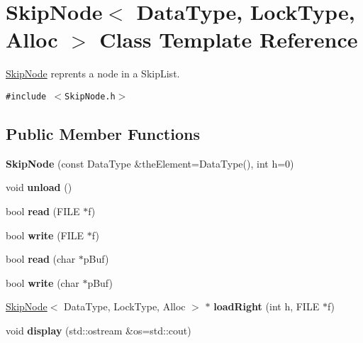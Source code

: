 \hypertarget{classSkipNode}{
\section{SkipNode$<$ DataType, LockType, Alloc $>$ Class Template Reference}
\label{classSkipNode}
}
\hyperlink{classSkipNode}{SkipNode} reprents a node in a SkipList.  


{\tt \#include $<$SkipNode.h$>$}

\subsection*{Public Member Functions}
\begin{CompactItemize}
\item 
\hypertarget{classSkipNode_6c98e4822d4b00cddbb01b01d07b5408}{
\textbf{SkipNode} (const DataType \&theElement=DataType(), int h=0)}
\label{classSkipNode_6c98e4822d4b00cddbb01b01d07b5408}

\item 
\hypertarget{classSkipNode_98dbc2bd65c86d186c8a7df78812d7b5}{
void \textbf{unload} ()}
\label{classSkipNode_98dbc2bd65c86d186c8a7df78812d7b5}

\item 
\hypertarget{classSkipNode_3ba2f338d42d5c75101e5488c72e8ee8}{
bool \textbf{read} (FILE $\ast$f)}
\label{classSkipNode_3ba2f338d42d5c75101e5488c72e8ee8}

\item 
\hypertarget{classSkipNode_beb14d9210efcfb491ef2514f7fccb56}{
bool \textbf{write} (FILE $\ast$f)}
\label{classSkipNode_beb14d9210efcfb491ef2514f7fccb56}

\item 
\hypertarget{classSkipNode_ed83502414cf57bc6109df98a44a3e8a}{
bool \textbf{read} (char $\ast$pBuf)}
\label{classSkipNode_ed83502414cf57bc6109df98a44a3e8a}

\item 
\hypertarget{classSkipNode_a6aca290272390e4b8243b5da9352f77}{
bool \textbf{write} (char $\ast$pBuf)}
\label{classSkipNode_a6aca290272390e4b8243b5da9352f77}

\item 
\hypertarget{classSkipNode_21213e3ce0f3aafb584bd1ce63b655ac}{
\hyperlink{classSkipNode}{SkipNode}$<$ DataType, LockType, Alloc $>$ $\ast$ \textbf{loadRight} (int h, FILE $\ast$f)}
\label{classSkipNode_21213e3ce0f3aafb584bd1ce63b655ac}

\item 
\hypertarget{classSkipNode_39f07b4f297bf75ab5e1843e81e32620}{
void \textbf{display} (std::ostream \&os=std::cout)}
\label{classSkipNode_39f07b4f297bf75ab5e1843e81e32620}

\end{CompactItemize}
